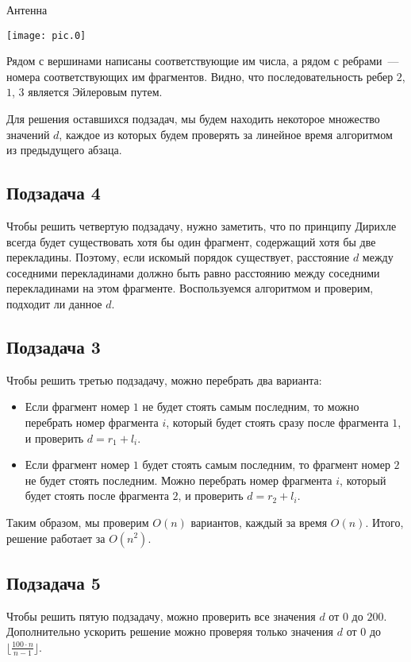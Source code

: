 \begin{tutorial}{Антенна}
\begin{center}
\texttt{[image: pic.0]}
\end{center}

Рядом с вершинами написаны соответствующие им числа, а рядом с ребрами~--- номера соответствующих им фрагментов. Видно, что последовательность ребер $2$, $1$, $3$ является Эйлеровым путем.

Для решения оставшихся подзадач, мы будем находить некоторое множество значений $d$, каждое из которых будем проверять за линейное время алгоритмом из предыдущего абзаца.

\subsection*{Подзадача 4}
Чтобы решить четвертую подзадачу, нужно заметить, что по принципу Дирихле всегда будет существовать хотя бы один фрагмент, содержащий хотя бы две перекладины. Поэтому, если искомый порядок существует, расстояние $d$ между соседними перекладинами должно быть равно расстоянию между соседними перекладинами на этом фрагменте. Воспользуемся алгоритмом и проверим, подходит ли данное $d$.

\subsection*{Подзадача 3}
Чтобы решить третью подзадачу, можно перебрать два варианта:
\begin{itemize}
\item Если фрагмент номер $1$ не будет стоять самым последним, то можно перебрать номер фрагмента $i$, который будет стоять сразу после фрагмента $1$, и проверить $d = r_1 + l_i$.
\item Если фрагмент номер $1$ будет стоять самым последним, то фрагмент номер $2$ не будет стоять последним. Можно перебрать номер фрагмента $i$, который будет стоять после фрагмента $2$, и проверить $d = r_2 + l_i$.
\end{itemize}

Таким образом, мы проверим $O(n)$ вариантов, каждый за время $O(n)$. Итого, решение работает за $O(n^2)$.

\subsection*{Подзадача 5}
Чтобы решить пятую подзадачу, можно проверить все значения $d$ от $0$ до $200$. Дополнительно ускорить решение можно проверяя только значения $d$ от $0$ до $\lfloor\frac{100 \cdot n}{n - 1}\rfloor$.


\end{tutorial}
